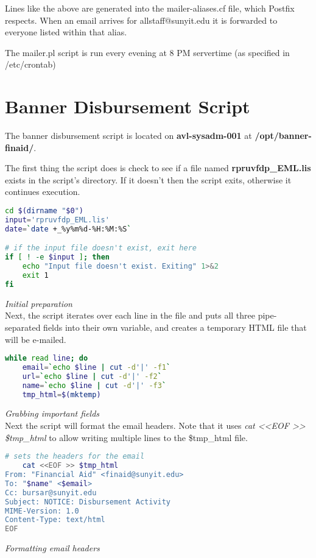 \documentclass[a4paper]{article}
\begin{document}
Lines like the above are generated into the mailer-aliases.cf file, which Postfix respects. When an email arrives for allstaff@sunyit.edu it is forwarded to everyone listed within that alias.

The mailer.pl script is run every evening at 8 PM servertime (as specified in /etc/crontab)

\section{Banner Disbursement Script}

The banner disbursement script is located on \textbf{avl-sysadm-001} at \textbf{/opt/banner-finaid/}. 

The first thing the script does is check to see if a file named \textbf{rpruvfdp\_EML.lis} exists in the script's directory. If it doesn't then the script exits, otherwise it continues execution.
\begin{lstlisting}[language=bash]
cd $(dirname "$0")
input='rpruvfdp_EML.lis'
date=`date +_%y%m%d-%H:%M:%S`

# if the input file doesn't exist, exit here
if [ ! -e $input ]; then
    echo "Input file doesn't exist. Exiting" 1>&2
    exit 1
fi
\end{lstlisting}
\hfill\textit{Initial preparation}\\

Next, the script iterates over each line in the file and puts all three pipe-separated fields into their own variable, and creates a temporary HTML file that will be e-mailed.

\begin{lstlisting}[language=bash]
while read line; do
    email=`echo $line | cut -d'|' -f1`
    url=`echo $line | cut -d'|' -f2`
    name=`echo $line | cut -d'|' -f3`
    tmp_html=$(mktemp)
\end{lstlisting}
\hfill\textit{Grabbing important fields}\\

Next the script will format the email headers. Note that it uses \textit{cat <<EOF >> \$tmp\_html} to allow writing multiple lines to the \$tmp\_html file.

\begin{lstlisting}[language=bash]
    # sets the headers for the email
    cat <<EOF >> $tmp_html
From: "Financial Aid" <finaid@sunyit.edu>
To: "$name" <$email>
Cc: bursar@sunyit.edu
Subject: NOTICE: Disbursement Activity
MIME-Version: 1.0
Content-Type: text/html
EOF
\end{lstlisting}
\hfill\textit{Formatting email headers}\\
\end{document}
